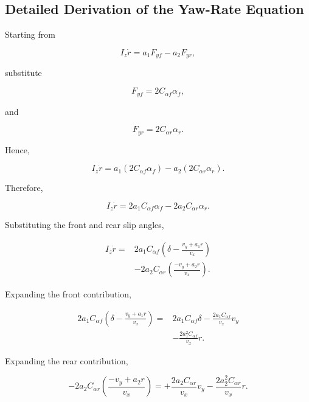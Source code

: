 \documentclass[12pt,a4paper]{article}
\begin{document}
\subsection{Detailed Derivation of the Yaw-Rate Equation}

Starting from

\begin{equation}
I_z\dot r
=
a_1F_{yf}
-
a_2F_{yr},
\end{equation}

substitute

\begin{equation}
F_{yf}=2C_{\alpha f}\alpha_f,
\end{equation}

and

\begin{equation}
F_{yr}=2C_{\alpha r}\alpha_r.
\end{equation}

Hence,

\begin{equation}
I_z\dot r
=
a_1\left(2C_{\alpha f}\alpha_f\right)
-
a_2\left(2C_{\alpha r}\alpha_r\right).
\end{equation}

Therefore,

\begin{equation}
I_z\dot r
=
2a_1C_{\alpha f}\alpha_f
-
2a_2C_{\alpha r}\alpha_r.
\end{equation}

Substituting the front and rear slip angles,

\begin{align}
I_z\dot r
={}&
2a_1C_{\alpha f}
\left(
\delta-\frac{v_y+a_1r}{v_x}
\right)
\nonumber\\
&-
2a_2C_{\alpha r}
\left(
\frac{-v_y+a_2r}{v_x}
\right).
\end{align}

Expanding the front contribution,

\begin{align}
2a_1C_{\alpha f}
\left(
\delta-\frac{v_y+a_1r}{v_x}
\right)
={}&
2a_1C_{\alpha f}\delta
-
\frac{2a_1C_{\alpha f}}{v_x}v_y
\nonumber\\
&-
\frac{2a_1^2C_{\alpha f}}{v_x}r.
\end{align}

Expanding the rear contribution,

\begin{equation}
-2a_2C_{\alpha r}
\left(
\frac{-v_y+a_2r}{v_x}
\right)
=
+
\frac{2a_2C_{\alpha r}}{v_x}v_y
-
\frac{2a_2^2C_{\alpha r}}{v_x}r.
\end{equation}
\end{document}
